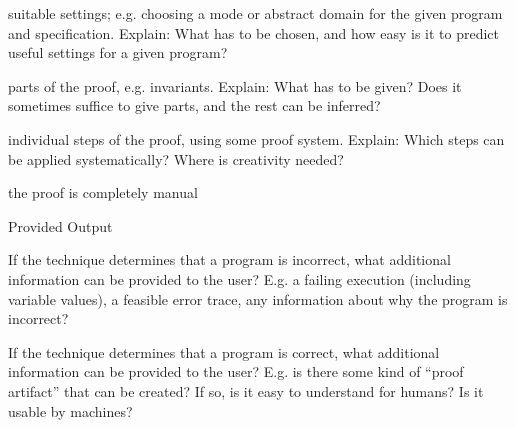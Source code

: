 \documentclass[a4paper]{article}
\begin{document}
\begin{minipage}[t]{0.16\linewidth}
\begin{betterlist}
\begin{betterlist}
			\item \checkboxUnchecked suitable settings; e.g. choosing a mode or abstract domain for the given program and specification. Explain: What has to be chosen, and how easy is it to predict useful settings for a given program?

			\item \checkboxUnchecked parts of the proof, e.g. invariants. Explain: What has to be given? Does it sometimes suffice to give parts, and the rest can be inferred?

			\item \checkboxUnchecked individual steps of the proof, using some proof system. Explain: Which steps can be applied systematically? Where is creativity needed?

			\item \checkboxUnchecked the proof is completely manual
		\end{betterlist}
		\item \alert{Provided Output}
		\begin{betterlist}
			\item If the technique determines that a program is incorrect, what additional information can be provided to the user? E.g. a failing execution (including variable values), a feasible error trace, any information about why the program is incorrect?

			\item If the technique determines that a program is correct, what additional information can be provided to the user? E.g. is there some kind of \enquote{proof artifact} that can be created? If so, is it easy to understand for humans? Is it usable by machines?


\end{betterlist}
\end{betterlist}
\end{minipage}
\end{document}
